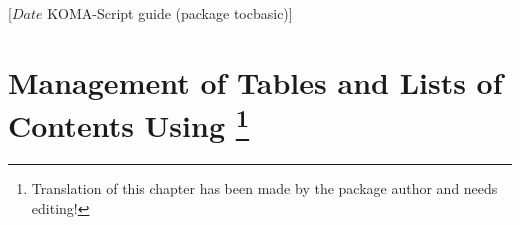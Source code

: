 %
%
%
%
%
%
%
%
% 
%
%
%
%

                 [$Date$
                  KOMA-Script guide (package tocbasic)]



\chapter[{Management of Tables and Lists of Contents Using
  \Package{tocbasic}}]
  {Management of Tables and Lists of Contents Using
  \protect\footnote{Translation of this chapter has been
    made by the package author and needs editing!}}

